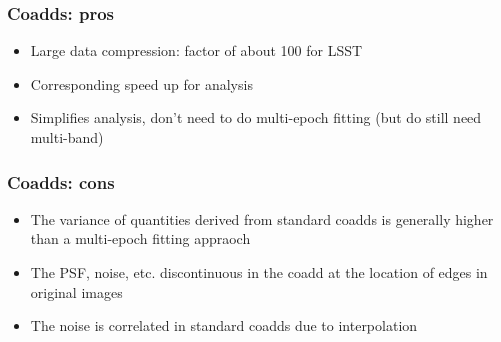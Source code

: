\documentclass{beamer}
\begin{document}
\frame
{
    \frametitle{Coadds: pros}

    \begin{itemize}

        \item Large data compression:  factor of about 100 for LSST

        \item Corresponding speed up for analysis

        \item Simplifies analysis, don't need to do multi-epoch fitting (but do
            still need multi-band)

    \end{itemize}

}

\frame
{
    \frametitle{Coadds: cons}

    \begin{itemize}

        \item The variance of quantities derived from standard coadds is
            generally higher than a multi-epoch fitting appraoch

        \item The PSF, noise, etc. discontinuous in the coadd at the location
            of edges in original images

        \item The noise is correlated in standard coadds due to interpolation


    \end{itemize}

}
\end{document}
